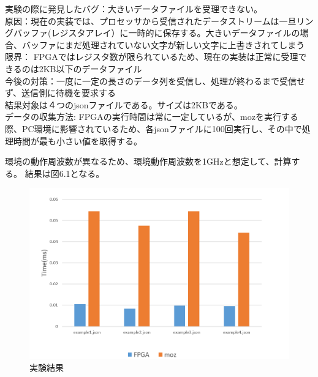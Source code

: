 \documentclass[12pt,oneside]{report}
\begin{document}
実験の際に発見したバグ：大きいデータファイルを受理できない。\\
原因：現在の実装では、プロセッサから受信されたデータストリームは一旦リングバッファ(レジスタアレイ）に一時的に保存する。大きいデータファイルの場合、バッファにまだ処理されていない文字が新しい文字に上書きされてしまう\\
限界： FPGAではレジスタ数が限られているため、現在の実装は正常に受理できるのは2KB以下のデータファイル\\
今後の対策：一度に一定の長さのデータ列を受信し、処理が終わるまで受信せず、送信側に待機を要求する\\


結果対象は４つのjsonファイルである。サイズは2KBである。\\
データの収集方法: FPGAの実行時間は常に一定しているが、mozを実行する際、PC環境に影響されているため、各jsonファイルに100回実行し、その中で処理時間が最も小さい値を取得する。

環境の動作周波数が異なるため、環境動作周波数を1GHzと想定して、計算する。
結果は図6.1となる。


\begin{figure}[t]
    \begin{center}
        \includegraphics[width=130mm]{./fig/result.png}
       \caption{実験結果}
        \label{fig:result}
    \end{center}
\end{figure}


\end{document}
